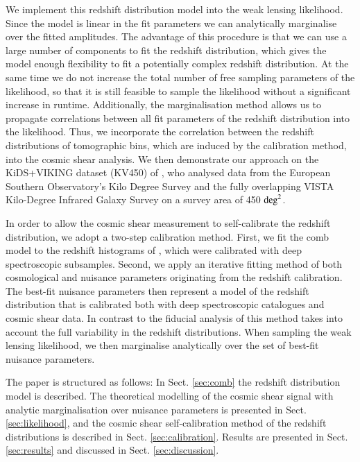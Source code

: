 \documentclass{aa}
\begin{document}
We implement this redshift distribution model into the weak lensing likelihood. Since the model is linear in the fit parameters we can analytically marginalise over the fitted amplitudes. The advantage of this procedure is that we can use a large number of components to fit the redshift distribution, which gives the model enough flexibility to fit a potentially complex redshift distribution. At the same time we do not increase the total number of free sampling parameters of the likelihood, so that it is still feasible to sample the likelihood without a significant increase in runtime. Additionally, the marginalisation method allows us to propagate correlations between all fit parameters of the redshift distribution into the likelihood. Thus, we incorporate the correlation between the redshift distributions of tomographic bins, which are induced by the calibration method, into the cosmic shear analysis. We then demonstrate our approach on the KiDS+VIKING dataset (KV450) of \cite{hildebrandt18}, who analysed data from the European Southern Observatory's Kilo Degree Survey \citep[KiDS; ][]{kuijken15, kuijken19,dejong15,dejong17} and the fully overlapping VISTA Kilo-Degree Infrared Galaxy Survey \citep[VIKING; ][]{2013Msngr.154...32E} on a survey area of 450 ${\rm deg}^2$.

In order to allow the cosmic shear measurement to self-calibrate the redshift distribution, we adopt a two-step calibration method. First, we fit the comb model to the redshift histograms of \cite{hildebrandt18}, which were calibrated with deep spectroscopic subsamples. Second, we apply an iterative fitting method of both cosmological and nuisance parameters originating from the redshift calibration. The best-fit nuisance parameters then represent a model of the redshift distribution that is calibrated both with deep spectroscopic catalogues and cosmic shear data. In contrast to the fiducial analysis of \cite{hildebrandt18} this method takes into account the full variability in the redshift distributions. When sampling the weak lensing likelihood, we then marginalise analytically over the set of best-fit nuisance parameters.
 
The paper is structured as follows: In Sect. \ref{sec:comb} the redshift distribution model is described. The theoretical modelling of the cosmic shear signal with analytic marginalisation over nuisance parameters is presented in Sect. \ref{sec:likelihood}, and the cosmic shear self-calibration method of the redshift distributions is described in Sect. \ref{sec:calibration}. Results are presented in Sect. \ref{sec:results} and discussed in Sect. \ref{sec:discussion}.
 
\end{document}
